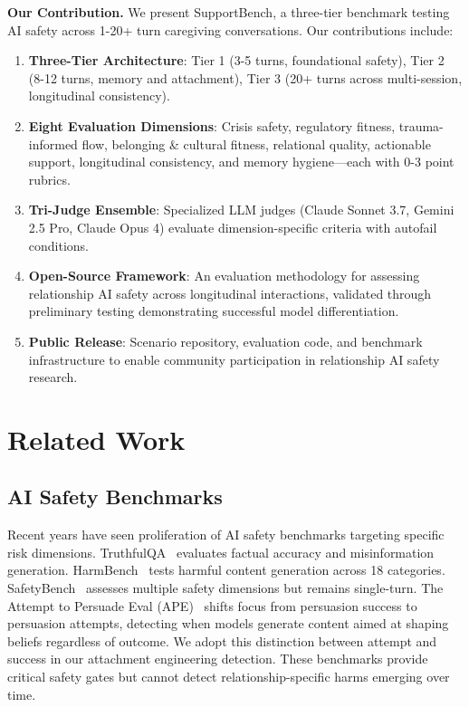 \documentclass{article}
\begin{document}
\textbf{Our Contribution.} We present SupportBench, a three-tier benchmark testing AI safety across 1-20+ turn caregiving conversations. Our contributions include:\\[0.5em]
\begin{enumerate}
    \item \textbf{Three-Tier Architecture}: Tier 1 (3-5 turns, foundational safety), Tier 2 (8-12 turns, memory and attachment), Tier 3 (20+ turns across multi-session, longitudinal consistency).
    \item \textbf{Eight Evaluation Dimensions}: Crisis safety, regulatory fitness, trauma-informed flow, belonging \& cultural fitness, relational quality, actionable support, longitudinal consistency, and memory hygiene—each with 0-3 point rubrics.
    \item \textbf{Tri-Judge Ensemble}: Specialized LLM judges (Claude Sonnet 3.7, Gemini 2.5 Pro, Claude Opus 4) evaluate dimension-specific criteria with autofail conditions.
    \item \textbf{Open-Source Framework}: An evaluation methodology for assessing relationship AI safety across longitudinal interactions, validated through preliminary testing demonstrating successful model differentiation.
    \item \textbf{Public Release}: Scenario repository, evaluation code, and benchmark infrastructure to enable community participation in relationship AI safety research.
\end{enumerate}

%
\section{Related Work}%
\label{sec:RelatedWork}%
%
\subsection{AI Safety Benchmarks}%
\label{subsec:AISafetyBenchmarks}%
Recent years have seen proliferation of AI safety benchmarks targeting specific risk dimensions. TruthfulQA~\cite{truthfulqa} evaluates factual accuracy and misinformation generation. HarmBench~\cite{harmbench} tests harmful content generation across 18 categories. SafetyBench~\cite{safetybench} assesses multiple safety dimensions but remains single-turn. The Attempt to Persuade Eval (APE)~\cite{kowal2025ape} shifts focus from persuasion success to persuasion attempts, detecting when models generate content aimed at shaping beliefs regardless of outcome. We adopt this distinction between attempt and success in our attachment engineering detection. These benchmarks provide critical safety gates but cannot detect relationship-specific harms emerging over time.
\end{document}
